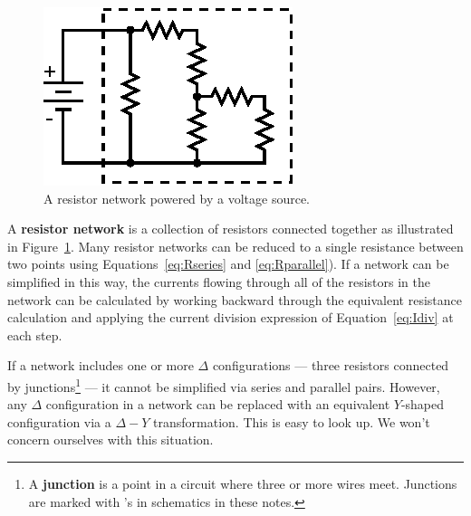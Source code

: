 \documentclass[11pt]{article}
\begin{document}
\begin{figure}[ht]
  \begin{center}
    \includegraphics{rnetwork.eps}
    \caption{A resistor network powered by a voltage source.}
    \label{fig:rnetwork}
  \end{center}
\end{figure}

A \textbf{resistor network} is a collection of resistors connected
together as illustrated in Figure~\ref{fig:rnetwork}. Many resistor
networks can be reduced to a single resistance between two points using
Equations~\ref{eq:Rseries} and \ref{eq:Rparallel}). If a network can
be simplified in this way, the currents flowing through all of the
resistors in the network can be calculated by working backward through
the equivalent resistance calculation and applying the current
division expression of Equation~\ref{eq:Idiv} at each step.

If a network includes one or more $\Delta$ configurations --- three
resistors connected by junctions\footnote{A \textbf{junction} is a
  point in a circuit where three or more wires meet. Junctions are
  marked with \textbullet's in schematics in these notes.} --- it
cannot be simplified via series and parallel pairs. However, any
$\Delta$ configuration in a network can be replaced with an equivalent
$Y$-shaped configuration via a $\Delta-Y$ transformation. This is easy
to look up. We won't concern ourselves with this situation.

\vspace{12 pt}
\noindent
{}
  
\end{document}
